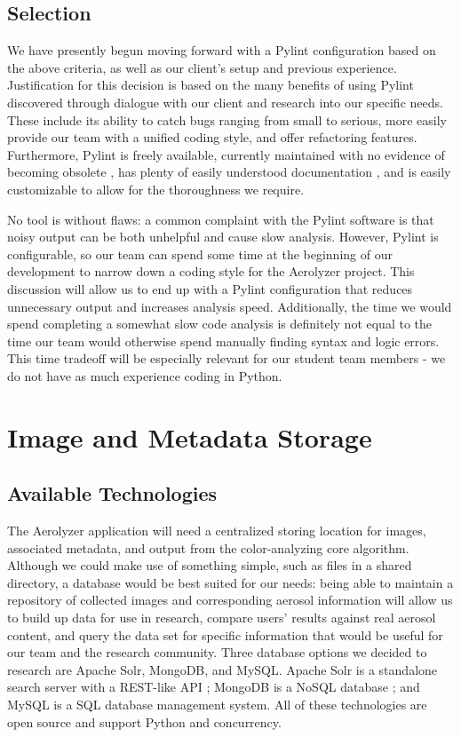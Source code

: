 \documentclass[onecolumn, draftclsnofoot,10pt, compsoc]{IEEEtran}
\begin{document}
\begin{flushleft}
\subsection{Selection}
We have presently begun moving forward with a Pylint configuration based on the above criteria, as well as our client's setup and previous experience. Justification for this decision is based on the many benefits of using Pylint discovered through dialogue with our client and research into our specific needs. These include its ability to catch bugs ranging from small to serious, more easily provide our team with a unified coding style, and offer refactoring features. Furthermore, Pylint is freely available, currently maintained with no evidence of becoming obsolete \cite{4}, has plenty of easily understood documentation \cite{3}, and is easily customizable to allow for the thoroughness we require.  

\medskip

No tool is without flaws: a common complaint with the Pylint software is that noisy output can be both unhelpful and cause slow analysis. \cite{2} However, Pylint is configurable, so our team can spend some time at the beginning of our development to narrow down a coding style for the Aerolyzer project. This discussion will allow us to end up with a Pylint configuration that reduces unnecessary output and increases analysis speed. Additionally, the time we would spend completing a somewhat slow code analysis is definitely not equal to the time our team would otherwise spend manually finding syntax and logic errors. This time tradeoff will be especially relevant for our student team members - we do not have as much experience coding in Python. 


\section{Image and Metadata Storage}
\subsection{Available Technologies}
The Aerolyzer application will need a centralized storing location for images, associated metadata, and output from the color-analyzing core algorithm. Although we could make use of something simple, such as files in a shared directory, a database would be best suited for our needs: being able to maintain a repository of collected images and corresponding aerosol information will allow us to build up data for use in research, compare users' results against real aerosol content, and query the data set for specific information that would be useful for our team and the research community. Three database options we decided to research are Apache Solr, MongoDB, and MySQL. Apache Solr is a standalone search server with a REST-like API \cite{5}; MongoDB is a NoSQL database \cite{6}; and MySQL is a SQL database management system\cite{7}. All of these technologies are open source and support Python and concurrency. \cite{8}




\end{flushleft}
\end{document}
